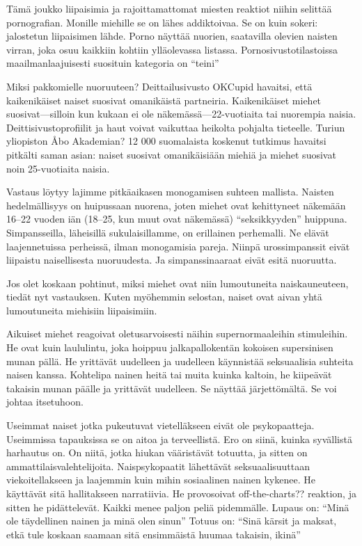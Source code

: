 Tämä joukko liipaisimia ja rajoittamattomat miesten reaktiot niihin selittää pornografian. Monille miehille se on lähes addiktoivaa. Se on kuin sokeri: jalostetun liipaisimen lähde. Porno näyttää nuorien, saatavilla olevien naisten virran, joka osuu kaikkiin kohtiin ylläolevassa listassa. Pornosivustotilastoissa maailmanlaajuisesti suosituin kategoria on ``teini''

Miksi pakkomielle nuoruuteen? Deittailusivusto OKCupid havaitsi, että kaikenikäiset naiset suosivat omanikäistä partneiria. Kaikenikäiset miehet suosivat---silloin kun kukaan ei ole näkemässä---22-vuotiaita tai nuorempia naisia. Deittisivustoprofiilit ja haut voivat vaikuttaa heikolta pohjalta tieteelle. Turiun yliopiston Åbo Akademian? 12 000 suomalaista koskenut tutkimus havaitsi pitkälti saman asian: naiset suosivat omanikäisiään miehiä ja miehet suosivat noin 25-vuotiaita naisia.

Vastaus löytyy lajimme pitkäaikasen monogamisen suhteen mallista. Naisten hedelmällisyys on huipussaan nuorena, joten miehet ovat kehittyneet näkemään 16--22 vuoden iän (18--25, kun muut ovat näkemässä) ``seksikkyyden'' huippuna. Simpansseilla, läheisillä sukulaisillamme, on erillainen perhemalli. Ne elävät laajennetuissa perheissä, ilman monogamisia pareja. Niinpä urossimpanssit eivät liipaistu naisellisesta nuoruudesta. Ja simpanssinaaraat eivät esitä nuoruutta.

Jos olet koskaan pohtinut, miksi miehet ovat niin lumoutuneita naiskauneuteen, tiedät nyt vastauksen. Kuten myöhemmin selostan, naiset ovat aivan yhtä lumoutuneita miehisiin liipaisimiin.

Aikuiset miehet reagoivat oletusarvoisesti näihin supernormaaleihin stimuleihin. He ovat kuin laululintu, joka hoippuu jalkapallokentän kokoisen supersinisen munan pällä. He yrittävät uudelleen ja uudelleen käynnistää seksuaalisia suhteita naisen kanssa. Kohtelipa nainen heitä tai muita kuinka kaltoin, he kiipeävät takaisin munan päälle ja yrittävät uudelleen. Se näyttää järjettömältä. Se voi johtaa itsetuhoon.

Useimmat naiset jotka pukeutuvat vietelläkseen eivät ole psykopaatteja. Useimmissa tapauksissa se on aitoa ja terveellistä. Ero on siinä, kuinka syvällistä harhautus on. On niitä, jotka hiukan vääristävät totuutta, ja sitten on ammattilaisvalehtelijoita. Naispsykopaatit lähettävät seksuaalisuuttaan viekoitellakseen ja laajemmin kuin mihin sosiaalinen nainen kykenee. He käyttävät sitä hallitakseen narratiivia. He provosoivat off-the-charts?? reaktion, ja sitten he pidättelevät. Kaikki menee paljon peliä pidemmälle. Lupaus on: ``Minä ole täydellinen nainen ja minä olen sinun'' Totuus on: ``Sinä kärsit ja maksat, etkä tule koskaan saamaan sitä ensimmäistä huumaa takaisin, ikinä''

